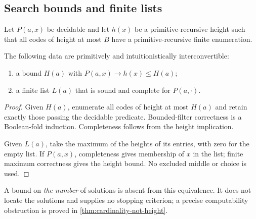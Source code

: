 \subsection{Search bounds and finite lists}

Let \(P(a,x)\) be decidable and let \(h(x)\) be a primitive-recursive height
such that all codes of height at most \(B\) have a primitive-recursive finite
enumeration.

\begin{theorem}
\label{thm:height-list}
The following data are primitively and intuitionistically interconvertible:
\begin{enumerate}
\item a bound \(H(a)\) with \(P(a,x)\to h(x)\le H(a)\);
\item a finite list \(L(a)\) that is sound and complete for \(P(a,\cdot)\).
\end{enumerate}
\end{theorem}

\begin{proof}
Given \(H(a)\), enumerate all codes of height at most \(H(a)\) and retain
exactly those passing the decidable predicate.  Bounded-filter correctness is
a Boolean-fold induction.  Completeness follows from the height implication.

Given \(L(a)\), take the maximum of the heights of its entries, with zero for
the empty list.  If \(P(a,x)\), completeness gives membership of \(x\) in the
list; finite maximum correctness gives the height bound.  No excluded middle
or choice is used.
\end{proof}

A bound on \emph{the number} of solutions is absent from this equivalence.  It
does not locate the solutions and supplies no stopping criterion; a precise
computability obstruction is proved in \cref{thm:cardinality-not-height}.
